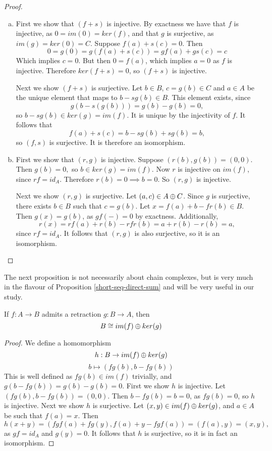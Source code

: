 \begin{proof}
\begin{enumerate}[(a)]
\item First we show that $(f+s)$ is injective. By exactness we have that $f$ is injective, as $0=im(0)=ker(f)$, and that $g$ is surjective, as $im(g)=ker(0)=C$. Suppose $f(a)+s(c)=0$. Then $$0=g(0)=g(f(a)+s(c))=gf(a)+gs(c)=c$$
Which implies $c=0$. But then $0=f(a)$, which implies $a=0$ as $f$ is injective. Therefore $ker(f+s)=0$, so $(f+s)$ is injective.

Next we show $(f+s)$ is surjective. Let $b\in B$, $c=g(b)\in C$ and $a\in A$ be the unique element that maps to $b-sg(b)\in B$. This element exists, since $$g(b-s(g(b)))=g(b)-g(b)=0,$$ so $b-sg(b)\in ker(g)=im(f)$. It is unique by the injectivity of $f$. It follows that $$f(a)+s(c)=b-sg(b)+sg(b)=b,$$ so $(f,s)$ is surjective. It is therefore an isomorphism.

\item First we show that $(r,g)$ is injective. Suppose $(r(b),g(b))=(0,0)$. Then $g(b)=0,$ so $b\in ker(g)=im(f)$. Now $r$ is injective on $im(f)$, since $rf=id_A$. Therefore $r(b)=0\implies b=0$. So $(r,g)$ is injective.

Next we show $(r,g)$ is surjective. Let $(a,c)\in A\oplus C$. Since $g$ is surjective, there exists $b\in B$ such that $c=g(b)$. Let $x=f(a)+b-fr(b)\in B$. Then $g(x)=g(b)$, as $gf(-)=0$ by exactness. Additionally, $$r(x)=rf(a)+r(b)-rfr(b)=a+r(b)-r(b)=a,$$
since $rf=id_A$. It follows that $(r,g)$ is also surjective, so it is an isomorphism.
\end{enumerate}

\end{proof}

The next proposition is not necessarily about chain complexes, but is very much in the flavour of Proposition \ref{short-seq-direct-sum} and will be very useful in our study.

\begin{proposition}\label{retraction-iso}
If $f:A\rightarrow B$ admits a retraction $g:B\rightarrow A$, then $$B\cong im(f)\oplus ker(g)$$
\end{proposition}

\begin{proof}
We define a homomorphism $$h:B\rightarrow im(f)\oplus ker(g)$$
$$b\mapsto (fg(b),b-fg(b))$$
This is well defined as $fg(b)\in im(f)$ trivially, and $g(b-fg(b))=g(b)-g(b)=0$.
First we show $h$ is injective. Let $(fg(b),b-fg(b))=(0,0)$. Then $b-fg(b)=b=0$, as $fg(b)=0$, so $h$ is injective. Next we show $h$ is surjective. Let $(x,y)\in im(f)\oplus ker(g)$, and $a\in A$ be such that $f(a)=x$. Then $$h(x+y)=(fgf(a)+fg(y),f(a)+y-fgf(a))=(f(a),y)=(x,y),$$
as $gf=id_A$ and $g(y)=0$.
It follows that $h$ is surjective, so it is in fact an isomorphism.\end{proof}

